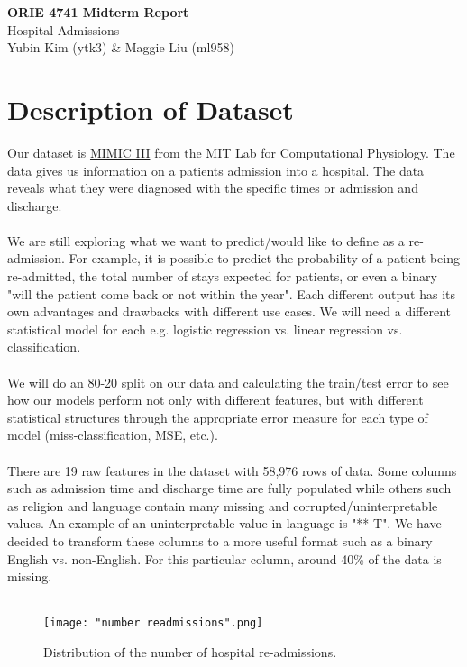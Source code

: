 \documentclass[12pt]{article}
\begin{document}
\begin{center}
    \LARGE{\textbf{ORIE 4741 Midterm Report}} \\
    \vspace{.5em}
    \LARGE{Hospital Admissions} \\
    \vspace{.5em}
    \normalsize{Yubin Kim (ytk3) \& Maggie Liu (ml958)}
\end{center}

\section{Description of Dataset}
Our dataset is \href{https://mimic.physionet.org}{MIMIC III} from the MIT Lab for Computational Physiology. The data gives us information on a patients admission into a hospital. The data reveals what they were diagnosed with the specific times or admission and discharge.
\\ \\ 
We are still exploring what we want to predict/would like to define as a re-admission. For example, it is possible to predict the probability of a patient being re-admitted, the total number of stays expected for patients, or even a binary "will the patient come back or not within the year". Each different output has its own advantages and drawbacks with different use cases. We will need a different statistical model for each e.g. logistic regression vs. linear regression vs. classification.
\\ \\
We will do an 80-20 split on our data and calculating the train/test error to see how our models perform not only with different features, but with different statistical structures through the appropriate error measure for each type of model (miss-classification, MSE, etc.).
\\ \\
There are 19 raw features in the dataset with 58,976 rows of data. Some columns such as admission time and discharge time are fully populated while others such as religion and language contain many missing and corrupted/uninterpretable values. An example of an uninterpretable value in language is "** T". We have decided to transform these columns to a more useful format such as a binary English vs. non-English. For this particular column, around 40\% of the data is missing.
\\ \\

\begin{figure}[htp]
    \centering
    \texttt{[image: "number readmissions".png]}
    \caption{Distribution of the number of hospital re-admissions.}
    \label{fig:num-read}
\end{figure}
\end{document}
